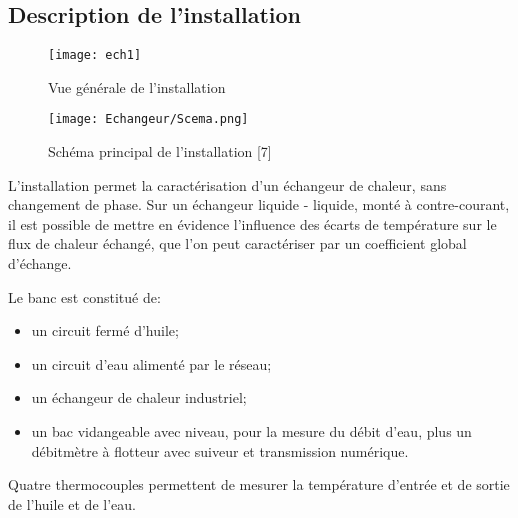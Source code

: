 \documentclass[14pt]{article}
\begin{document}
\subsection{Description de l'installation}
\begin{figure}[h!]
\begin{center}
\begin{minipage}[h]{0.45\linewidth}
	\texttt{[image: ech1]}
	\caption{Vue générale de l'installation}			
\end{minipage}
	\hfill
\begin{minipage}[h]{0.45\linewidth}


	\texttt{[image: Echangeur/Scema.png]}
	\caption{Schéma principal de l'installation [7]}	
	\end{minipage}		
\end{center}
\end{figure}
L’installation permet la caractérisation d’un échangeur de chaleur, sans changement de phase. Sur un échangeur liquide - liquide, monté à contre-courant, il est possible de mettre en évidence l’influence des écarts de température sur le flux de chaleur échangé, que l’on peut caractériser par un coefficient global d’échange.

Le banc est constitué de:

\begin{itemize}
\renewcommand{\labelitemi}{$\bullet$}
	\item un circuit fermé d’huile;
	\item un circuit d’eau alimenté par le réseau;
	\item un échangeur de chaleur industriel;
	\item un bac vidangeable avec niveau, pour la mesure du débit d’eau, plus un débitmètre à flotteur avec suiveur et transmission numérique.
\end{itemize}


Quatre thermocouples permettent de mesurer la température d'entrée et de sortie de l'huile et de l'eau.
\end{document}
